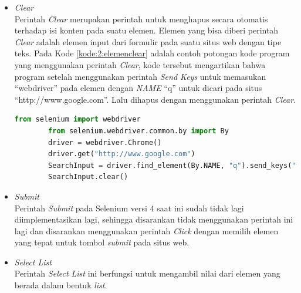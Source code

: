 \begin{itemize}
	\item \textit{Clear}\\
	Perintah \textit{Clear} merupakan perintah untuk menghapus secara otomatis terhadap isi konten pada suatu elemen. Elemen yang bisa diberi perintah \textit{Clear} adalah elemen input dari formulir pada suatu situs web dengan tipe teks. Pada Kode \ref{kode:2:elemenclear} adalah contoh potongan kode program yang menggunakan perintah \textit{Clear}, kode tersebut mengartikan bahwa program setelah menggunakan perintah \textit{Send Keys} untuk memasukan ``webdriver'' pada elemen dengan \textit{NAME} ``q'' untuk dicari pada situs ``http://www.google.com''. Lalu dihapus dengan menggunakan perintah \textit{Clear}.
	\begin{lstlisting}[language=python, caption=Contoh Potongan Kode Perintah \textit{Clear} pada Suatu Elemen, label=kode:2:elemenclear]
		from selenium import webdriver
		from selenium.webdriver.common.by import By
		driver = webdriver.Chrome()
		driver.get("http://www.google.com")
		SearchInput = driver.find_element(By.NAME, "q").send_keys("webdriver")
		SearchInput.clear()
	\end{lstlisting}
	
	\item \textit{Submit}\\
	Perintah \textit{Submit} pada Selenium versi 4 saat ini sudah tidak lagi diimplementasikan lagi, sehingga disarankan tidak menggunakan perintah ini lagi dan disarankan menggunakan perintah \textit{Click} dengan memilih elemen yang tepat untuk tombol \textit{submit} pada situs web.
	
	\item \textit{Select List}\\
	Perintah \textit{Select List} ini berfungsi untuk mengambil nilai dari elemen yang berada dalam bentuk \textit{list}.
\end{itemize}

